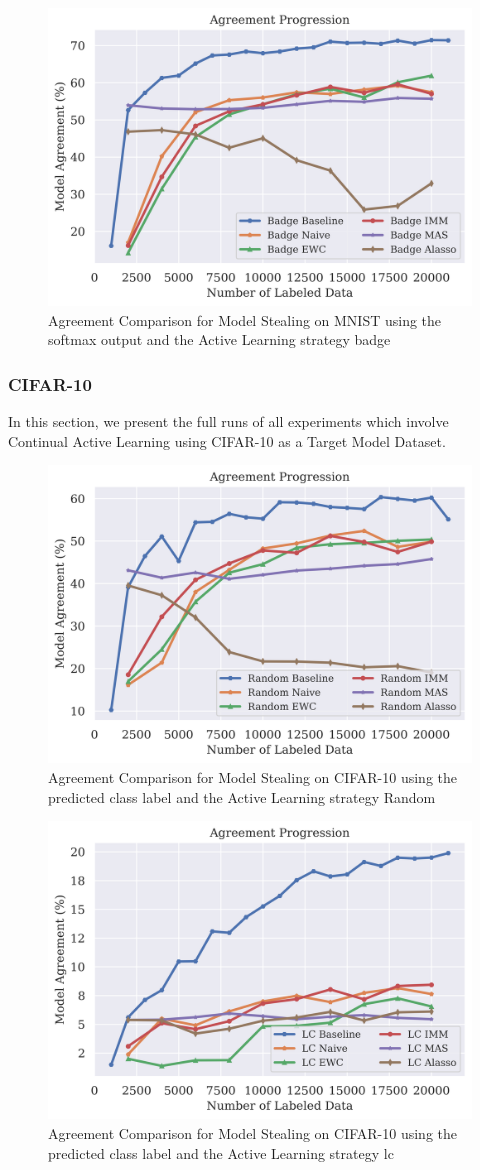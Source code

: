 \begin{figure}[!htb]
    \centering
    \includegraphics[width=0.5\linewidth]{images/results_CALMS/cifar_softmax_badge.png}
    \caption{Agreement Comparison for Model Stealing on MNIST using the softmax output and the Active Learning strategy \gls{badge}}
    \label{fig:CALMSMNISTSoftmaxBadge}
\end{figure}

\subsubsection{CIFAR-10}
\label{sec:Appendix:CALMS:CIFAR}
In this section, we present the full runs of all experiments which involve Continual Active Learning using CIFAR-10 as a Target Model Dataset.
\begin{figure}[!htb]
    \centering
    \includegraphics[width=0.5\linewidth]{images/results_CALMS/cifar_label_random.png}
    \caption{Agreement Comparison for Model Stealing on CIFAR-10 using the predicted class label and the Active Learning strategy Random}
    \label{fig:CALMSCIFAR10LabelRandom}
\end{figure}

\begin{figure}[!htb]
    \centering
    \includegraphics[width=0.5\linewidth]{images/results_CALMS/cifar100_label_lc.png}
    \caption{Agreement Comparison for Model Stealing on CIFAR-10 using the predicted class label and the Active Learning strategy \gls{lc}}
    \label{fig:CALMSCIFAR10LabelLC}
\end{figure}

